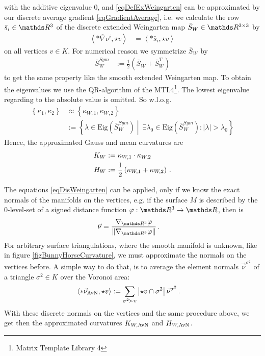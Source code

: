     with the additive eigenvalue 0,
    and \eqref{eqDefExWeingarten} can be approximated by our discrete average gradient \eqref{eqGradientAverage},
    i.e. we calculate the  row \( \bar{s}_{i}\in\R^{3} \) of the discrete extended Weingarten map \( \bar{S}_{W}\in\R^{3\times 3} \) by
    \begin{align} \label{eqDisWeingarten}
      \left\langle *\overline{\nabla}\nu^{i} , \star v \right\rangle 
        &= \left\langle *\bar{s}_{i} , \star v \right\rangle
    \end{align}
    on all vertices \( v\in K \).
    For numerical reason we symmetrize \( \bar{S}_{W} \) by
    \begin{align}
      \bar{S}_{W}^{Sym} &:= \frac{1}{2}\left( \bar{S}_{W} + \bar{S}_{W}^{T} \right)
    \end{align}
    to get the same property like the smooth extended Weingarten map.
    To obtain the eigenvalues we use the QR-algorithm of the MTL4\footnote{Matrix Template Library 4}.
    The lowest eigenvalue regarding to the absolute value is omitted.
    So w.l.o.g.
    \begin{align}
      \left\{\kappa_{1},\kappa_{2}\right\} &\approx \left\{ \kappa_{W,1}, \kappa_{W,2} \right\} \\ 
                    &:= \left\{ \lambda\in\text{Eig}(\bar{S}_{W}^{Sym}) \middle|\ \exists\lambda_{0}\in\text{Eig}(\bar{S}_{W}^{Sym}): \left| \lambda \right| > \lambda_{0} \right\} 
    \end{align}
    Hence, the approximated Gauss and mean curvatures are
    \begin{align}
      K_{W} &:= \kappa_{W,1} \cdot \kappa_{W,2} \\
      H_{W} &:= \frac{1}{2}\left( \kappa_{W,1} + \kappa_{W,2} \right) \,\text{.}
    \end{align}

    The equations \eqref{eqDisWeingarten} can be applied, only if we know the exact normals of the manifolds on the vertices, 
    e.g. if the surface \( M \) is described by the 0-level-set of a signed distance function \( \varphi:\R^{3}\rightarrow\R \),
    then is
    \begin{align}
      \vec{\nu} &= \frac{\nabla_{\R^{3}}\varphi}{\left\| \nabla_{\R^{3}}\varphi \right\|} \formpunkt
    \end{align}
    For arbitrary surface triangulations, where the smooth manifold is unknown, like in figure \ref{figBunnyHorseCurvature},
    we must approximate the normals on the vertices before.
    A simple way to do that, is to average the element normals \( \vec{\nu}^{\sigma^{2}} \) of a triangle \( \sigma^{2}\in K \)
    over the Voronoi area:
    \begin{align}
      \left\langle *\vec{\nu}_{\text{AvN}} , \star v \right\rangle
        &:= \sum_{\sigma^{2}\succ v} \left| \star v \cap \sigma^{2} \right| \vec{\nu}^{\sigma^{2}} \,\text{.}
    \end{align}
    With these discrete normals on the vertices and the same procedure above, 
    we get then the approximated curvatures \( K_{W,\text{AvN}} \) and \( H_{W,\text{AvN}} \).

